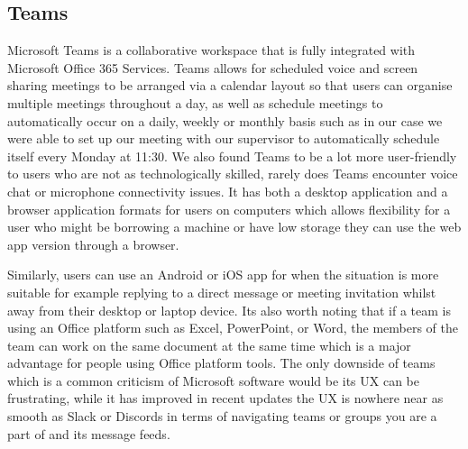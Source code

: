 \subsection{Teams}
Microsoft Teams is a collaborative workspace that is fully integrated with Microsoft Office 365 Services. Teams allows for scheduled voice and screen sharing meetings to be arranged via a calendar layout so that users can organise multiple meetings throughout a day, as well as schedule meetings to automatically occur on a daily, weekly or monthly basis such as in our case we were able to set up our meeting with our supervisor to automatically schedule itself every Monday at 11:30. 
\newline \newline 
We also found Teams to be a lot more user-friendly to users who are not as technologically skilled, rarely does Teams encounter voice chat or microphone connectivity issues. 
\newpage
It has both a desktop application and a browser application formats for users on computers which allows flexibility for a user who might be borrowing a machine or have low storage they can use the web app version through a browser.
\newline

Similarly, users can use an Android or iOS app for when the situation is more suitable for example replying to a direct message or meeting invitation whilst away from their desktop or laptop device. Its also worth noting that if a team is using an Office platform such as Excel, PowerPoint, or Word, the members of the team can work on the same document at the same time which is a major advantage for people using Office platform tools. The only downside of teams which is a common criticism of Microsoft software would be its UX can be frustrating, while it has improved in recent updates the UX is nowhere near as smooth as Slack or Discords in terms of navigating teams or groups you are a part of and its message feeds.


